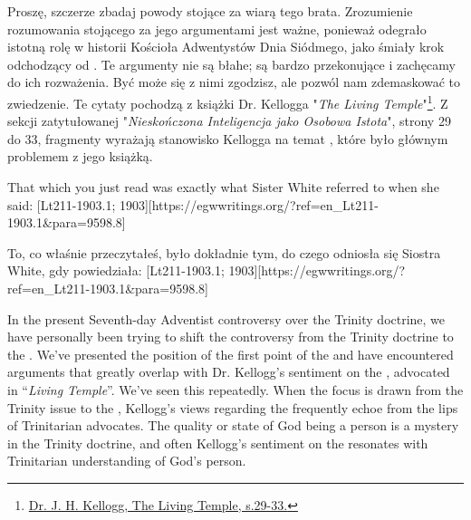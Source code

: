 Proszę, szczerze zbadaj powody stojące za wiarą tego brata. Zrozumienie rozumowania stojącego za jego argumentami jest ważne, ponieważ odegrało istotną rolę w historii Kościoła Adwentystów Dnia Siódmego, jako śmiały krok odchodzący od . Te argumenty nie są błahe; są bardzo przekonujące i zachęcamy do ich rozważenia. Być może się z nimi zgodzisz, ale pozwól nam zdemaskować to zwiedzenie. Te cytaty pochodzą z książki Dr. Kellogga "\textit{The Living Temple}"\footnote{\href{https://archive.org/details/J.H.Kellogg.TheLivingTemple1903}{Dr. J. H. Kellogg, The Living Temple, s.29-33.}}. Z sekcji zatytułowanej "\textit{Nieskończona Inteligencja jako Osobowa Istota}", strony 29 do 33, fragmenty wyrażają stanowisko Kellogga na temat , które było głównym problemem z jego książką.


That which you just read was exactly what Sister White referred to when she said: [Lt211-1903.1; 1903][https://egwwritings.org/?ref=en\_Lt211-1903.1&para=9598.8]


To, co właśnie przeczytałeś, było dokładnie tym, do czego odniosła się Siostra White, gdy powiedziała: [Lt211-1903.1; 1903][https://egwwritings.org/?ref=en\_Lt211-1903.1&para=9598.8]


In the present Seventh-day Adventist controversy over the Trinity doctrine, we have personally been trying to shift the controversy from the Trinity doctrine to the . We’ve presented the position of the first point of the  and have encountered arguments that greatly overlap with Dr. Kellogg’s sentiment on the , advocated in “\textit{Living Temple}”. We’ve seen this repeatedly. When the focus is drawn from the Trinity issue to the , Kellogg’s views regarding the  frequently echoe from the lips of Trinitarian advocates. The quality or state of God being a person is a mystery in the Trinity doctrine, and often Kellogg’s sentiment on the  resonates with Trinitarian understanding of God’s person.


